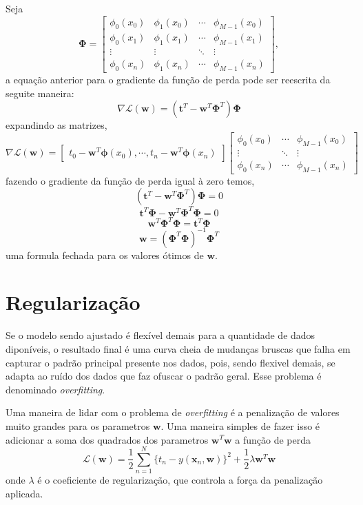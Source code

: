 \documentclass{article}
\begin{document}
Seja
\[ \boldsymbol{\Phi} = \begin{bmatrix}
    \phi_0(x_0) & \phi_1(x_0) & \dotsb & \phi_{M-1}(x_0) \\
    \phi_0(x_1) & \phi_1(x_1) & \dotsb & \phi_{M-1}(x_1) \\
    \vdots & \vdots & \ddots & \vdots \\
    \phi_0(x_n) & \phi_1(x_n) & \dotsb & \phi_{M-1}(x_n)
\end{bmatrix},
\]
a equação anterior para o gradiente da função de perda pode ser reescrita da seguite maneira:
\[
    \nabla \mathcal{L}(\textbf{w}) = (\textbf{t}^T - \textbf{w}^T \boldsymbol{\Phi}^T) \boldsymbol{\Phi}
\]
expandindo as matrizes,
\[
    \nabla \mathcal{L}(\textbf{w}) = 
    \begin{bmatrix} t_0 - \textbf{w}^T \boldsymbol{\phi}(x_0), \dotsb, t_n - \textbf{w}^T \boldsymbol{\phi}(x_n)\end{bmatrix}
    \begin{bmatrix}
        \phi_0(x_0) & \dotsb & \phi_{M-1}(x_0) \\
        \vdots & \ddots & \vdots \\
        \phi_0(x_n) & \dotsb & \phi_{M-1}(x_n)
    \end{bmatrix}
\]
fazendo o gradiente da função de perda igual à zero temos,
\[
    (\textbf{t}^T - \textbf{w}^T \boldsymbol{\Phi}^T) \boldsymbol{\Phi} = 0
\]
\[
    \textbf{t}^T \boldsymbol{\Phi} - \textbf{w}^T \boldsymbol{\Phi}^T \boldsymbol{\Phi} = 0
\]
\[
    \textbf{w}^T \boldsymbol{\Phi}^T \boldsymbol{\Phi} = \textbf{t}^T \boldsymbol{\Phi}
\]
\[
    \textbf{w} = (\boldsymbol{\Phi}^T \boldsymbol{\Phi})^{-1} \boldsymbol{\Phi}^T
\]
uma formula fechada para os valores ótimos de \( \textbf{w} \).

\section{Regularização}

Se o modelo sendo ajustado é flexível demais para a quantidade de dados diponíveis, o resultado final
é uma curva cheia de mudanças bruscas que falha em capturar o padrão principal presente nos dados, pois,
sendo flexivel demais, se adapta ao ruído dos dados que faz ofuscar o padrão geral. Esse problema é
denominado \emph{overfitting}.

Uma maneira de lidar com o problema de \emph{overfitting} é a penalização de valores muito grandes para 
os parametros \( \textbf{w} \). Uma maneira simples de fazer isso é adicionar a soma dos quadrados dos 
parametros \( \textbf{w}^T \textbf{w} \) a função de perda
\[ \mathcal{L}(\textbf{w}) = \frac{1}{2} \sum_{n=1}^{N} \{ t_n - y(\textbf{x}_n, \textbf{w})\}^2 + \frac{1}{2} \lambda \textbf{w}^T \textbf{w} \]
onde \( \lambda \) é o coeficiente de regularização, que controla a força da penalização aplicada.
\end{document}
